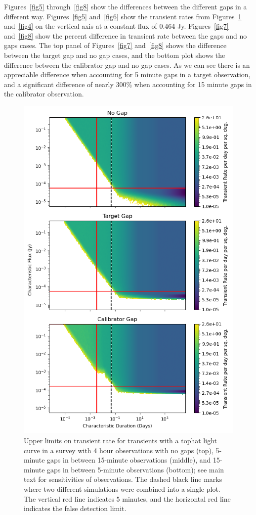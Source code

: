 \documentclass[12pt]{article}
\begin{document}
Figures~\ref{fig5} through~\ref{fig8} show the differences between the different gaps in a different way. Figures~\ref{fig5} and~\ref{fig6} show the transient rates from Figures~\ref{fig3} and~\ref{fig4} on the vertical axis at a constant flux of 0.464 Jy. Figures~\ref{fig7} and~\ref{fig8} show the percent difference in transient rate between the gaps and no gaps cases. The top panel of Figures~\ref{fig7} and~\ref{fig8} shows the difference between the target gap and no gap cases, and the bottom plot shows the difference between the calibrator gap and no gap cases. As we can see there is an appreciable difference when accounting for 5 minute gaps in a target observation, and a significant difference of nearly 300\% when accounting for 15 minute gaps in the calibrator observation.

\begin{figure}
\includegraphics[width=0.75\columnwidth]{figure3.png}
\caption{Upper limits on transient rate for transients with a tophat light curve in a survey with 4 hour observations with no gaps (top), 5-minute gaps in between 15-minute observations (middle), and 15-minute gaps in between 5-minute observations (bottom); see main text for sensitivities of observations. The dashed black line marks where two different simulations were combined into a single plot. The vertical red line indicates 5 minutes, and the horizontal red line indicates the false detection limit.}
\label{fig3}
 \end{figure}
 
\end{document}
